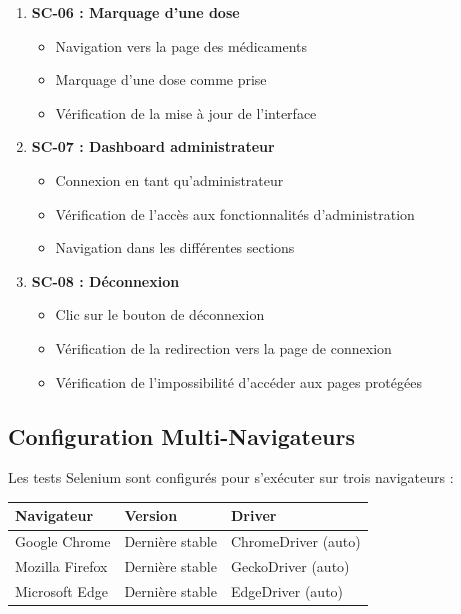 \documentclass[12pt,a4paper]{report}
\begin{document}
\begin{enumerate}
    \item \textbf{SC-06 : Marquage d'une dose}
    \begin{itemize}
        \item Navigation vers la page des médicaments
        \item Marquage d'une dose comme prise
        \item Vérification de la mise à jour de l'interface
    \end{itemize}
    
    \item \textbf{SC-07 : Dashboard administrateur}
    \begin{itemize}
        \item Connexion en tant qu'administrateur
        \item Vérification de l'accès aux fonctionnalités d'administration
        \item Navigation dans les différentes sections
    \end{itemize}
    
    \item \textbf{SC-08 : Déconnexion}
    \begin{itemize}
        \item Clic sur le bouton de déconnexion
        \item Vérification de la redirection vers la page de connexion
        \item Vérification de l'impossibilité d'accéder aux pages protégées
    \end{itemize}
\end{enumerate}

\subsection{Configuration Multi-Navigateurs}

Les tests Selenium sont configurés pour s'exécuter sur trois navigateurs :

\begin{center}
\begin{tabular}{|l|l|l|}
    \hline
    \textbf{Navigateur} & \textbf{Version} & \textbf{Driver} \\
    \hline
    Google Chrome & Dernière stable & ChromeDriver (auto) \\
    \hline
    Mozilla Firefox & Dernière stable & GeckoDriver (auto) \\
    \hline
    Microsoft Edge & Dernière stable & EdgeDriver (auto) \\
    \hline
\end{tabular}
\end{center}
\end{document}
